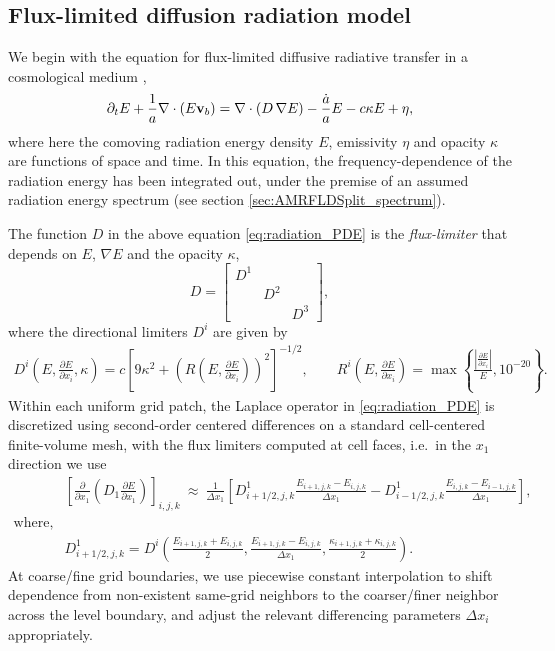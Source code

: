 \documentclass[letterpaper,10pt]{article}
\renewcommand{\(}{\left(}
\renewcommand{\)}{\right)}
\newcommand{\vb}{{\bf v}_b}
\newcommand{\dx}{\Delta x}
\begin{document}
\subsection{Flux-limited diffusion radiation model}
\label{sec:rad_model}

We begin with the equation for flux-limited diffusive radiative
transfer in a cosmological medium \cite{ReynoldsHayesPaschosNorman2009},
\begin{equation}
\label{eq:radiation_PDE}
  \partial_{t} E + \frac1a \nabla\cdot\(E\vb\) =
    \nabla\cdot\(D\,\nabla E\) - \frac{\dot{a}}{a} E - c\kappa E + \eta,
\end{equation}
where here the comoving radiation energy density $E$, emissivity
$\eta$ and opacity $\kappa$ are functions of space and time.  In this
equation, the frequency-dependence of the radiation energy has been
integrated out, under the premise of an assumed radiation energy
spectrum (see section \ref{sec:AMRFLDSplit_spectrum}).

The function $D$ in the above equation \eqref{eq:radiation_PDE} is
the {\em flux-limiter} that depends on $E$, $\nabla E$ and the 
opacity $\kappa$,  
\[
   D = \left[\begin{array}{ccc} D^{1} & & \\ & D^{2} & \\ & & D^{3} \end{array}\right],
\]
where the directional limiters $D^i$ are given by \cite{Morel2000}
\begin{align}
  \label{eq:Larsen_limiter}
   D^{i}\left(E,\tfrac{\partial E}{\partial x_i},\kappa\right) = 
     c \left[ 9\kappa^2 + 
     \left(R\left(E,\tfrac{\partial E}{\partial x_i}\right)\right)^2\right]^{-1/2}, \qquad
   R^i\left(E,\tfrac{\partial E}{\partial x_i}\right) = 
     \max\left\{\frac{\left|\tfrac{\partial E}{\partial x_i} \right|}{E}, 10^{-20} \right\}. 
\end{align}
Within each uniform grid patch, the Laplace operator in
\eqref{eq:radiation_PDE} is discretized using second-order centered
differences on a standard cell-centered finite-volume mesh, with the
flux limiters computed at cell faces, i.e.~in the $x_1$ direction we
use 
\begin{align*}
  &\left[\frac{\partial}{\partial x_1}\left(D_1
    \frac{\partial E}{\partial x_1}\right)\right]_{i,j,k} \ \approx \ 
  \frac{1}{\dx_1} \left[
    D^1_{i+1/2,j,k}\frac{E_{i+1,j,k}-E_{i,j,k}}{\dx_1} -
    D^1_{i-1/2,j,k}\frac{E_{i,j,k}-E_{i-1,j,k}}{\dx_1} \right],\\
  \text{where, e.g.} & \\
  & D^1_{i+1/2,j,k} = D^{i}\left(
     \tfrac{E_{i+1,j,k}+E_{i,j,k}}{2},
     \tfrac{E_{i+1,j,k}-E_{i,j,k}}{\dx_1},
     \tfrac{\kappa_{i+1,j,k}+\kappa_{i,j,k}}{2}\right).
\end{align*}
At coarse/fine grid boundaries, we use piecewise constant
interpolation to shift dependence from non-existent same-grid
neighbors to the coarser/finer neighbor across the level boundary,
and adjust the relevant differencing parameters $\dx_i$
appropriately. 
\end{document}
